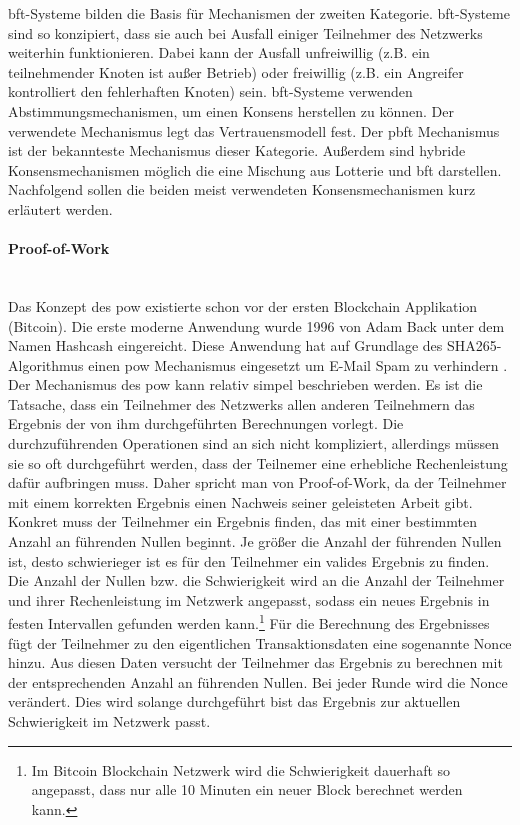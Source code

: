 \acf{bft}-Systeme bilden die Basis für Mechanismen der zweiten Kategorie. \ac{bft}-Systeme sind so konzipiert, dass sie auch bei Ausfall einiger Teilnehmer des Netzwerks weiterhin funktionieren. Dabei kann der Ausfall unfreiwillig (z.B. ein teilnehmender Knoten ist außer Betrieb) oder freiwillig (z.B. ein Angreifer kontrolliert den fehlerhaften Knoten) sein. \ac{bft}-Systeme verwenden Abstimmungsmechanismen, um einen Konsens herstellen zu können. Der verwendete Mechanismus legt das Vertrauensmodell fest. Der \acf{pbft} Mechanismus ist der bekannteste Mechanismus dieser Kategorie.
Außerdem sind hybride Konsensmechanismen möglich die eine Mischung aus Lotterie und \ac{bft} darstellen. Nachfolgend sollen die beiden meist verwendeten Konsensmechanismen kurz erläutert werden.

\paragraph{Proof-of-Work}$~~$\\
Das Konzept des \acf{pow} existierte schon vor der ersten Blockchain Applikation (Bitcoin). Die erste moderne Anwendung wurde 1996 von Adam Back unter dem Namen \glqq Hashcash\grqq{} eingereicht. Diese Anwendung hat auf Grundlage des SHA265-Algorithmus einen \ac{pow} Mechanismus eingesetzt um E-Mail Spam zu verhindern \citep{Back2002}. Der Mechanismus des \ac{pow} kann relativ simpel beschrieben werden. Es ist die Tatsache, dass ein Teilnehmer des Netzwerks allen anderen Teilnehmern das Ergebnis der von ihm durchgeführten Berechnungen vorlegt. Die durchzuführenden Operationen sind an sich nicht kompliziert, allerdings müssen sie so oft durchgeführt werden, dass der Teilnemer eine erhebliche Rechenleistung dafür aufbringen muss. Daher spricht man von \glqq Proof-of-Work\grqq{}, da der Teilnehmer mit einem korrekten Ergebnis einen Nachweis seiner geleisteten Arbeit gibt. Konkret muss der Teilnehmer ein Ergebnis finden, das mit einer  bestimmten Anzahl an führenden Nullen beginnt. Je größer die Anzahl der führenden Nullen ist, desto schwierieger ist es für den Teilnehmer ein valides Ergebnis zu finden. Die Anzahl der Nullen bzw. die Schwierigkeit wird an die Anzahl der Teilnehmer und ihrer Rechenleistung im Netzwerk angepasst, sodass ein neues Ergebnis in festen Intervallen gefunden werden kann.\footnote{Im Bitcoin Blockchain Netzwerk wird die Schwierigkeit dauerhaft so angepasst, dass nur alle 10 Minuten ein neuer Block berechnet werden kann.} Für die Berechnung des Ergebnisses fügt der Teilnehmer zu den eigentlichen Transaktionsdaten eine sogenannte \glqq Nonce\grqq{} hinzu. Aus diesen Daten versucht der Teilnehmer das Ergebnis zu berechnen mit der entsprechenden Anzahl an führenden Nullen. Bei jeder Runde wird die \glqq Nonce\grqq{} verändert. Dies wird solange durchgeführt bist das Ergebnis zur aktuellen Schwierigkeit im Netzwerk passt.

